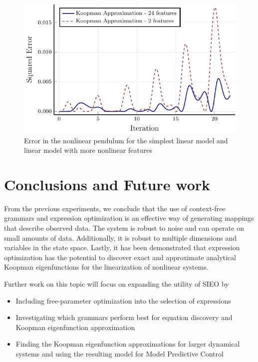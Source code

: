 \documentclass{article}
\begin{document}
\begin{figure}
\vskip 0.2in
\begin{center}
\centerline{\includegraphics[width=\columnwidth]{./figures/pendulum}}
\caption{Error in the nonlinear pendulum for the simplest linear model and linear model with more nonlinear features}
\label{fig:pendulum}
\end{center}
\vskip -0.2in
\end{figure}

\section{Conclusions and Future work}
\label{conclusion}

From the previous experiments, we conclude that the use of context-free grammars and expression optimization is an effective way of generating mappings that describe observed data. The system is robust to noise and can operate on small amounts of data. Additionally, it is robust to multiple dimensions and variables in the state space. Lastly, it has been demonstrated that expression optimization has the potential to discover exact and approximate analytical Koopman eigenfunctions for the linearization of nonlinear systems. 

Further work on this topic will focus on expanding the utility of SIEO by 
\begin{itemize}
\item Including free-parameter optimization into the selection of expressions
\item Investigating which grammars perform best for equation discovery and Koopman eigenfunction approximation
\item Finding the Koopman eigenfunction approximations for larger dynamical systems and using the resulting model for Model Predictive Control

\end{itemize}







\end{document}
